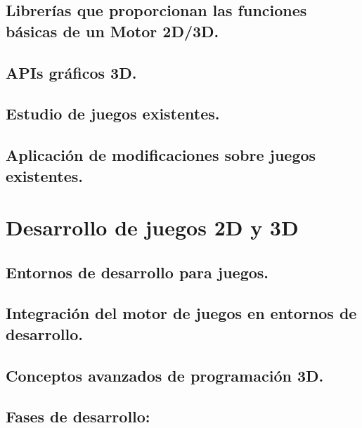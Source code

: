 \documentclass[a4paper,12pt,spanish]{sphinxmanual}
\begin{document}
\section{Librerías que proporcionan las funciones básicas de un Motor 2D/3D.}
\label{index:librerias-que-proporcionan-las-funciones-basicas-de-un-motor-2d-3d}

\section{APIs gráficos 3D.}
\label{index:apis-graficos-3d}

\section{Estudio de juegos existentes.}
\label{index:estudio-de-juegos-existentes}

\section{Aplicación de modificaciones sobre juegos existentes.}
\label{index:aplicacion-de-modificaciones-sobre-juegos-existentes}

\chapter{Desarrollo de juegos 2D y 3D}
\label{index:desarrollo-de-juegos-2d-y-3d}

\section{Entornos de desarrollo para juegos.}
\label{index:entornos-de-desarrollo-para-juegos}

\section{Integración del motor de juegos en entornos de desarrollo.}
\label{index:integracion-del-motor-de-juegos-en-entornos-de-desarrollo}

\section{Conceptos avanzados de programación 3D.}
\label{index:conceptos-avanzados-de-programacion-3d}

\section{Fases de desarrollo:}
\label{index:fases-de-desarrollo}
\end{document}
